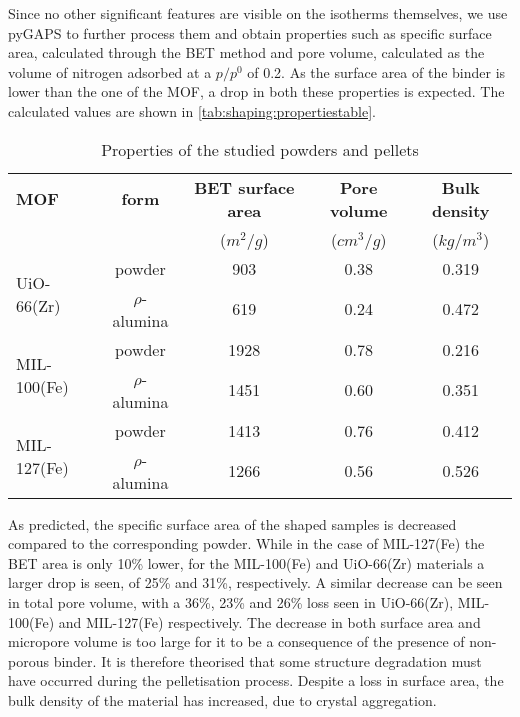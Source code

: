 Since no other significant features are visible on the isotherms themselves,
we use pyGAPS to further process them and obtain properties
such as specific surface area, calculated through the BET method and pore
volume, calculated as the volume of nitrogen
adsorbed at a \(p/p^0\) of 0.2.
As the surface area of the binder is lower than the
one of the MOF, a drop in both these properties is expected.
The calculated values are shown in
\autoref{tab:shaping:propertiestable}.

\begin{table}[htb]
	\centering
	\caption{Properties of the studied powders and pellets}
	\begin{tabular}{lcccc}
		\toprule
		\textbf{MOF}
		                             & \textbf{form}
		                             & \textbf{BET surface area}
		                             & \textbf{Pore volume}
		                             & \textbf{Bulk density}                                                 \\
		                             &                           & (\(m^2/g\)) & (\(cm^3/g\)) & (\(kg/m^3\)) \\
		\midrule
		\multirow{2}{*}{UiO-66(Zr)}  & powder                    & 903         & 0.38         & 0.319        \\
		                             & \(\rho\)-alumina          & 619         & 0.24         & 0.472        \\
		\multirow{2}{*}{MIL-100(Fe)} & powder                    & 1928        & 0.78         & 0.216        \\
		                             & \(\rho\)-alumina          & 1451        & 0.60         & 0.351        \\
		\multirow{2}{*}{MIL-127(Fe)} & powder                    & 1413        & 0.76         & 0.412        \\
		                             & \(\rho\)-alumina          & 1266        & 0.56         & 0.526        \\
		\bottomrule
	\end{tabular}%
	\label{tab:shaping:propertiestable}
\end{table}%

As predicted, the specific surface area of the shaped samples is
decreased compared to the corresponding powder. While in the case
of MIL-127(Fe) the BET area is only 10\% lower, for the MIL-100(Fe)
and UiO-66(Zr) materials a larger drop is seen, of 25\% and 31\%,
respectively.
A similar decrease can be seen in total pore volume,
with a 36\%, 23\% and 26\% loss seen
in UiO-66(Zr), MIL-100(Fe) and MIL-127(Fe) respectively.
The decrease in both surface area and micropore volume is
too large for it to be a consequence of the presence of non-porous binder.
It is therefore theorised that some structure degradation must have
occurred during the pelletisation process.
Despite a loss in surface area, the bulk density of the material
has increased, due to crystal aggregation.